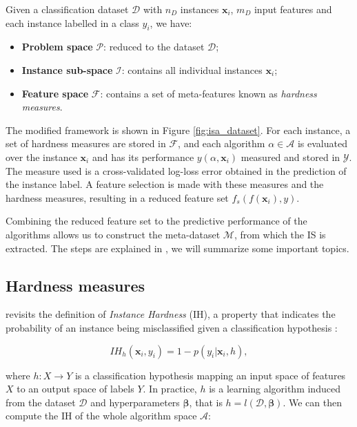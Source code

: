 Given a classification dataset $\mathcal{D}$ with $n_D$ instances $\mathbf{x}_i$, $m_D$ input features and each instance labelled in a class $y_i$, we have:

\begin{itemize}
	\item \textbf{Problem space} $\mathcal{P}$: reduced to the dataset $\mathcal{D}$;
	\item \textbf{Instance sub-space} $\mathcal{I}$: contains all individual instances $\mathbf{x}_i$;
	\item \textbf{Feature space} $\mathcal{F}$: contains a set of meta-features known as \emph{hardness measures}.
\end{itemize}

The modified framework is shown in Figure \ref{fig:isa_dataset}. For each instance, a set of hardness measures are stored in $\mathcal{F}$, and each algorithm $\alpha \in \mathcal{A}$ is evaluated over the instance $\mathbf{x}_i$ and has its performance $y(\alpha, \mathbf{x}_i)$ measured and stored in $\mathcal{Y}$. The measure used is a cross-validated log-loss error obtained in the prediction of the instance label. A feature selection is made with these measures and the hardness measures, resulting in a reduced feature set $f_s(f(\mathbf{x}_i), y)$.

Combining the reduced feature set to the predictive performance of the algorithms allows us to construct the meta-dataset $\mathcal{M}$, from which the IS is extracted. The steps are explained in \cite{Lorena2022}, we will summarize some important topics.

\subsection{Hardness measures} \label{subsec:hardness_measures}

\cite{Lorena2022} revisits the definition of \emph{Instance Hardness} (IH), a property that indicates the probability of an instance being misclassified given a classification hypothesis \cite{Smith2014}:

\begin{equation} \label{eq:instance_hardness}
	IH_h(\mathbf{x}_i, y_i) = 1 - p(y_i | \mathbf{x}_i, h),
\end{equation}

where $h: X \rightarrow Y$ is a classification hypothesis mapping an input space of features $X$ to an output space of labels $Y$. In practice, $h$ is a learning algorithm induced from the dataset $\mathcal{D}$ and hyperparameters $\mathbf{\beta}$, that is $h = l(\mathcal{D}, \mathbf{\beta})$. We can then compute the IH of the whole algorithm space $\mathcal{A}$:

